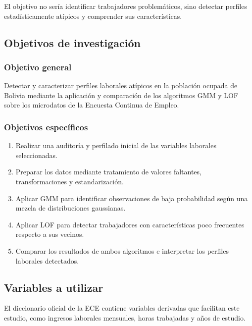 \documentclass[12pt,a4paper]{article}
\begin{document}
El objetivo no sería identificar trabajadores problemáticos, sino detectar perfiles estadísticamente atípicos y comprender sus características.

\subsection{Objetivos de investigación}

\subsubsection{Objetivo general}

Detectar y caracterizar perfiles laborales atípicos en la población ocupada de Bolivia mediante la aplicación y comparación de los algoritmos GMM y LOF sobre los microdatos de la Encuesta Continua de Empleo.

\subsubsection{Objetivos específicos}

\begin{enumerate}
  \item Realizar una auditoría y perfilado inicial de las variables laborales seleccionadas.
  \item Preparar los datos mediante tratamiento de valores faltantes, transformaciones y estandarización.
  \item Aplicar GMM para identificar observaciones de baja probabilidad según una mezcla de distribuciones gaussianas.
  \item Aplicar LOF para detectar trabajadores con características poco frecuentes respecto a sus vecinos.
  \item Comparar los resultados de ambos algoritmos e interpretar los perfiles laborales detectados.
\end{enumerate}

\subsection{Variables a utilizar}

El diccionario oficial de la ECE contiene variables derivadas que facilitan este estudio, como ingresos laborales mensuales, horas trabajadas y años de estudio.
\end{document}
